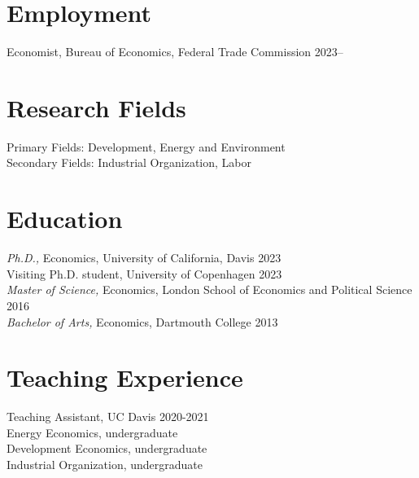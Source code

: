 \documentclass[10pt]{res} %
\begin{document}
	\begin{resume}
		
		\section{Employment}
		Economist, Bureau of Economics, Federal Trade Commission  \hfill 2023-- 
		\vspace{-\baselineskip} 
		\section{Research Fields}
		Primary Fields: Development,  Energy and Environment\\
		Secondary Fields: Industrial Organization, Labor
		\section{Education}
		{\sl Ph.D.,} Economics, University of California, Davis  \hfill 2023 \\
		\hspace*{6mm} Visiting Ph.D. student, University of Copenhagen \hfill 2023 \\
		{\sl Master of Science,} Economics, London School of Economics and Political Science \hfill 2016 \\
		{\sl Bachelor of Arts,} Economics, Dartmouth College \hfill 2013 \\
		\vspace{-\baselineskip} 
		\vspace{-\baselineskip} 
		\section{Teaching Experience} 
		Teaching Assistant, UC Davis  \hfill 2020-2021 \\
		\hspace*{6mm} Energy Economics, undergraduate \\
		\hspace*{6mm} Development Economics, undergraduate \\
		\hspace*{6mm} Industrial Organization, undergraduate  
		

\end{resume}
\end{document}
